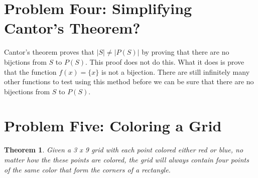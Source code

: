 \documentclass[10pt,letter]{article}
\newtheorem*{thm}{Theorem}
\begin{document}
\section*{Problem Four: Simplifying Cantor's Theorem?}
Cantor's theorem proves that $|S| \not = |P(S)|$ by proving that there are no bijctions from $S$ to $P(S)$. This proof does not do this. What it does is prove that the function $f(x) = \{x\}$ is not a bijection. There are still infinitely many other functions to test using this method before we can be sure that there are no bijections from $S$ to $P(S)$.

\section*{Problem Five: Coloring a Grid}
\begin{thm} Given a 3 x 9 grid with each point colored either red or blue, no matter how the these points are colored, the grid will always contain four points of the same color that form the corners of a rectangle. 
\end{thm}
\end{document}
